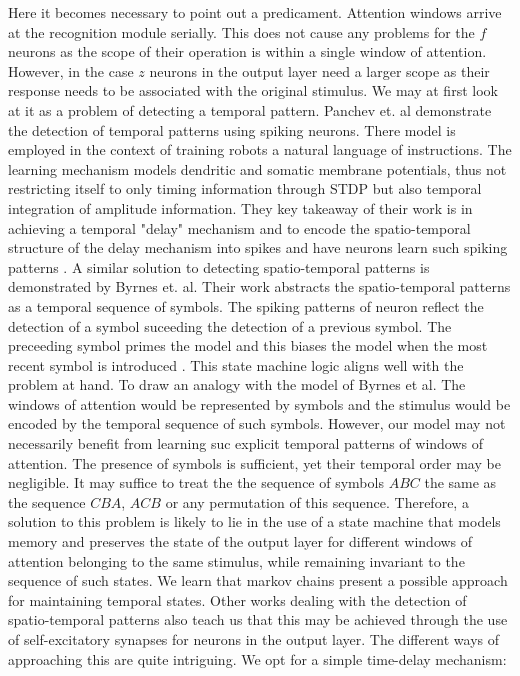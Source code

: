 \documentclass{report}
\begin{document}
Here it becomes necessary to point out a predicament. Attention windows arrive at the recognition module serially. This does not cause any problems for the $f$ neurons as the scope of their operation is within a single window of attention. However, in the case $z$ neurons in the output layer need a larger scope as their response needs to be associated with the original stimulus. 
We may at first look at it as a problem of detecting a temporal pattern. Panchev et. al demonstrate the detection of temporal patterns using spiking neurons. There model is employed in the context of training robots a natural language of instructions. The learning mechanism models dendritic and somatic membrane potentials, thus not restricting itself to only timing information through STDP but also temporal integration of amplitude information. They key takeaway of their work is in achieving a temporal "delay" mechanism and to encode the spatio-temporal structure of the delay mechanism into spikes and have neurons learn such spiking patterns \cite{Panchev2006}. A similar solution to detecting spatio-temporal patterns is demonstrated by Byrnes et. al. Their work abstracts the spatio-temporal patterns as a temporal sequence of symbols. The spiking patterns of neuron reflect the detection of a symbol suceeding the detection of a previous symbol. The preceeding symbol primes the model and this biases the model when the most recent symbol is introduced \cite{Byrnes2010}. This state machine logic aligns well with the problem at hand. To draw an analogy with the model of Byrnes et al. The windows of attention would be represented by symbols and the stimulus would be encoded by the temporal sequence of such symbols. However, our model may not necessarily benefit from learning suc explicit temporal patterns of windows of attention. The presence of symbols is sufficient, yet their temporal order may be negligible. It may suffice to treat the the sequence of symbols $ABC$ the same as the sequence $CBA$, $ACB$ or any permutation of this sequence. Therefore, a solution to this problem is likely to lie in the use of a state machine that models memory and preserves the state of the output layer for different windows of attention belonging to the same stimulus, while remaining invariant to the sequence of such states. We learn that markov chains present a possible approach for maintaining temporal states. Other works dealing with the detection of spatio-temporal patterns also teach us that this may be achieved through the use of self-excitatory synapses for neurons in the output layer. The different ways of approaching this are quite intriguing. We opt for a simple time-delay mechanism:\\
\end{document}
